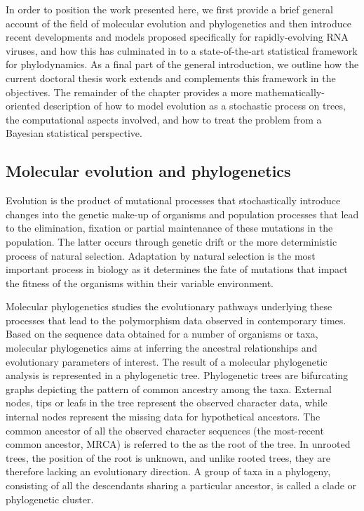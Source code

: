 In order to position the work presented here, we first provide a brief general account of the field of molecular evolution and phylogenetics and then introduce recent developments and models proposed specifically for rapidly-evolving RNA viruses, and how this has culminated in to a state-of-the-art statistical framework for phylodynamics.
As a final part of the general introduction, we outline how the current doctoral thesis work extends and complements this framework in the objectives.
The remainder of the chapter provides a more mathematically-oriented description of how to model evolution as a stochastic process on trees, the computational aspects involved, and how to treat the problem from a Bayesian statistical perspective.

\subsection{Molecular evolution and phylogenetics\label{sub:molevol}}

Evolution is the product of mutational processes that stochastically introduce changes into the genetic make-up of organisms and population processes that lead to the elimination, fixation or partial maintenance of these mutations in the population.
The latter occurs through genetic drift or the more deterministic process of natural selection. 
Adaptation by natural selection is the most important process in biology as it determines the fate of mutations that impact the fitness of the organisms within their variable environment.
 
Molecular phylogenetics studies the evolutionary pathways underlying these processes that lead to the polymorphism data observed in contemporary times.
Based on the sequence data obtained for a number of organisms or taxa, molecular phylogenetics aims at inferring the ancestral relationships and evolutionary parameters of interest.
The result of a molecular phylogenetic analysis is represented in a phylogenetic tree. 
Phylogenetic trees are bifurcating graphs depicting the pattern of common ancestry among the taxa.
External nodes, tips or leafs in the tree represent the observed character data, while internal nodes represent the missing data for hypothetical ancestors.  
The common ancestor of all the observed character sequences (the most-recent common ancestor, MRCA) is referred to the as the root of the tree.
In unrooted trees, the position of the root is unknown, and unlike rooted trees, they are therefore lacking an evolutionary direction.
A group of taxa in a phylogeny, consisting of all the descendants sharing a particular ancestor, is called a clade or phylogenetic cluster.

